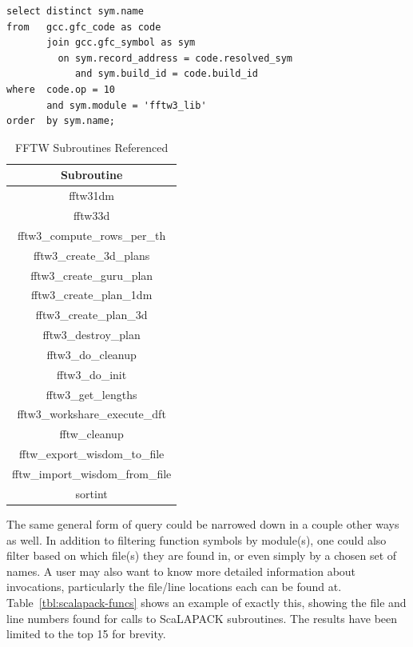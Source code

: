 \begin{lstlisting}[caption=Querying for Use of Library Functions, label=lst:fftw]
select distinct sym.name
from   gcc.gfc_code as code
       join gcc.gfc_symbol as sym
         on sym.record_address = code.resolved_sym
            and sym.build_id = code.build_id
where  code.op = 10
       and sym.module = 'fftw3_lib'
order  by sym.name;
\end{lstlisting}

\begin{table}[htbp]
\caption{FFTW Subroutines Referenced}
\begin{center}
\begin{tabular}{|c|}
\hline
\textbf{Subroutine} \\
\hline
fftw31dm \\
\hline
fftw33d \\
\hline
fftw3\_compute\_rows\_per\_th \\
\hline
fftw3\_create\_3d\_plans \\
\hline
fftw3\_create\_guru\_plan \\
\hline
fftw3\_create\_plan\_1dm \\
\hline
fftw3\_create\_plan\_3d \\
\hline
fftw3\_destroy\_plan \\
\hline
fftw3\_do\_cleanup \\
\hline
fftw3\_do\_init \\
\hline
fftw3\_get\_lengths \\
\hline
fftw3\_workshare\_execute\_dft \\
\hline
fftw\_cleanup \\
\hline
fftw\_export\_wisdom\_to\_file \\
\hline
fftw\_import\_wisdom\_from\_file \\
\hline
sortint \\
\hline
\end{tabular}
\label{tab:fftw-funcs}
\end{center}
\end{table}

The same general form of query could be narrowed down in a couple other ways as well.
In addition to filtering function symbols by module(s), one could also filter based on which file(s) they 
are found in, or even simply by a chosen set of names.
A user may also want to know more detailed information about invocations, particularly the file/line 
locations each can be found at.
Table~\ref{tbl:scalapack-funcs} shows an example of exactly this, showing the file and line numbers 
found for calls to ScaLAPACK subroutines.
The results have been limited to the top 15 for brevity.

